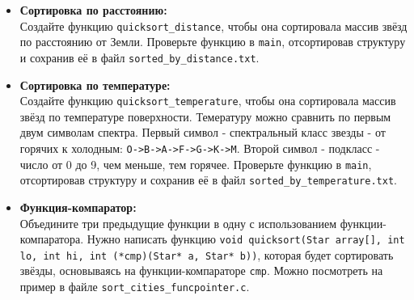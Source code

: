 \documentclass{article}
\begin{document}
\begin{itemize}
\item \textbf{Сортировка по расстоянию:}\\ Создайте функцию \texttt{quicksort\_distance}, чтобы она сортировала массив звёзд по расстоянию от Земли. Проверьте функцию в \texttt{main}, отсортировав структуру и сохранив её в файл \texttt{sorted\_by\_distance.txt}.

\item \textbf{Сортировка по температуре:}\\ Создайте функцию \texttt{quicksort\_temperature}, чтобы она сортировала массив звёзд по температуре поверхности. Темературу можно сравнить по первым двум символам спектра. Первый символ - спектральный класс звезды - от горячих к холодным: \texttt{O->B->A->F->G->K->M}. Второй символ - подкласс - число от 0 до 9, чем меньше, тем горячее. Проверьте функцию в \texttt{main}, отсортировав структуру и сохранив её в файл \texttt{sorted\_by\_temperature.txt}.

\item \textbf{Функция-компаратор:}\\ Объедините три предыдущие функции в одну с использованием функции-компаратора. Нужно написать функцию \texttt{void quicksort(Star array[], int lo, int hi, int (*cmp)(Star* a, Star* b))}, которая будет сортировать звёзды, основываясь на функции-компараторе \texttt{cmp}. Можно посмотреть на пример в файле \texttt{sort\_cities\_funcpointer.c}.
\end{itemize}
\end{document}

